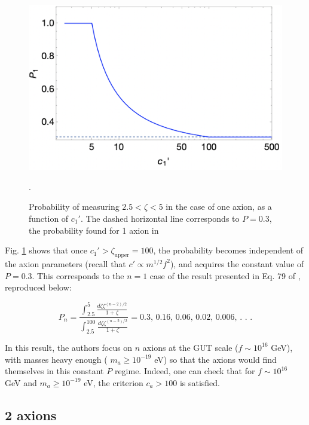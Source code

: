 \documentclass{article}
\begin{document}
\begin{figure}[h]
    \includegraphics[scale=0.5]{figs/1axion-prob.jpeg}
    \centering
    \caption{Probability of measuring $2.5<\zeta<5$ in the case of one axion, as a function of $c_1'$. The dashed horizontal line corresponds to $P=0.3$, the probability found for 1 axion in \cite{exploring-string-axiverse}}.
    \label{fig:1axion-prob}
\end{figure}

Fig. \ref{fig:1axion-prob} shows that once $c_1'>\zeta_\text{upper}=100$, the probability becomes independent of the axion parameters (recall that $c' \propto m^{1/2}f^2$), and acquires the constant value of $P=0.3$. This corresponds to the $n=1$ case of the result presented in Eq. 79 of \cite{exploring-string-axiverse}, reproduced below:

\begin{equation}
\label{eq:bookkeeping-result}
    P_n = \frac{\int_{2.5}^5 \frac{d\zeta \zeta^{(n-2)/2}}{1+\zeta}}{\int_{2.5}^{100}\frac{d\zeta \zeta^{(n-2)/2}}{1+\zeta}} = \text{0.3, 0.16, 0.06, 0.02, 0.006, . . .}
\end{equation}

\noindent In this result, the authors focus on $n$ axions at the GUT scale ($f\sim 10^{16}$ GeV), with masses heavy enough ( $m_a\geq10^{-19}$ eV) so that the axions would find themselves in this constant $P$ regime. Indeed, one can check that for $f\sim 10^{16}$ GeV and $m_a\geq10^{-19}$ eV, the criterion $c_a>100$ is satisfied.

\subsection{2 axions}
\end{document}
